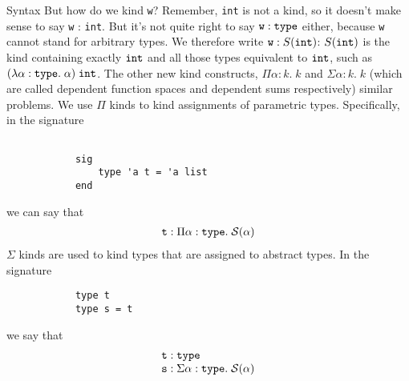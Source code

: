 \documentclass{amsart}
\newcommand{\type}{\ensuremath{\mathtt{type}}}
\begin{document}
\begin{section}{Syntax}
    But how do we kind \verb|w|? Remember, \verb|int| is not a kind, so it doesn't make sense to say \verb|w| : \verb|int|. But it's not quite right to say $\verb|w| : \type$ either, because \verb|w| cannot stand for arbitrary types. We therefore write $\verb|w| : S(\verb|int|)$: $S(\verb|int|)$ is the kind containing exactly $\verb|int|$ and all those types equivalent to $\verb|int|$, such as $(\lambda \alpha : \type. \; \alpha) \; \verb|int|$. The other new kind constructs, $\Pi \alpha : k. \; k$ and $\Sigma \alpha : k. \; k$ (which are called dependent function spaces and dependent sums respectively) similar problems. We use $\Pi$ kinds to kind assignments of parametric types. Specifically, in the signature
        \begin{verbatim}

            sig
                type 'a t = 'a list
            end
        \end{verbatim}
    we can say that
        \[
            \begin{array}{l}
                \verb|t| : \Pi \alpha : \type. \; \mathcal S(\alpha) 
            \end{array}
        \]
    $\Sigma$ kinds are used to kind types that are assigned to abstract types. In the signature
        \begin{verbatim}
            type t
            type s = t
        \end{verbatim}
    we say that
        \[
            \begin{array}{l}
                \verb|t| : \type \\
                \verb|s| : \Sigma \alpha : \type. \; \mathcal S(\alpha)
            \end{array}
        \]

\end{section}
\end{document}
